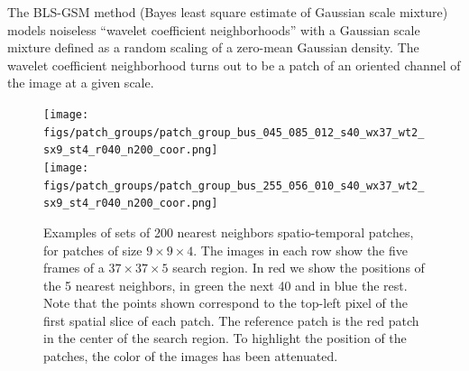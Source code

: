 \documentclass[10pt, a4paper]{article}
\begin{document}
The BLS-GSM method \cite{Portilla2003} (Bayes least square estimate of Gaussian
scale mixture) models noiseless ``wavelet coefficient neighborhoods'' with a
Gaussian scale mixture defined as a random scaling of a zero-mean Gaussian
density. The wavelet coefficient neighborhood turns out to be a patch of an
oriented channel of the image at a given scale.




\begin{figure}[htpb!]
	\centering
	\texttt{[image: figs/patch\_groups/patch\_group\_bus\_045\_085\_012\_s40\_wx37\_wt2\_sx9\_st4\_r040\_n200\_coor.png]}\\
	\vspace{.2cm}
	\texttt{[image: figs/patch\_groups/patch\_group\_bus\_255\_056\_010\_s40\_wx37\_wt2\_sx9\_st4\_r040\_n200\_coor.png]}
	\caption{Examples of sets of 200 nearest neighbors spatio-temporal patches,
	for patches of size $9\times 9\times 4$.
	The images in each row show the five frames of a $37\times37\times5$ search region. 
	In red we show the positions of the 5 nearest neighbors, in green the next 40 and in blue the rest.
	Note that the points shown correspond to the top-left pixel of the first spatial
	slice of each patch.
	The reference patch is the red patch in the center of the search region. To highlight the
	position of the patches, the color of the images has been attenuated.}
	\label{fig:patch_groups_pos}
\end{figure}
\end{document}
